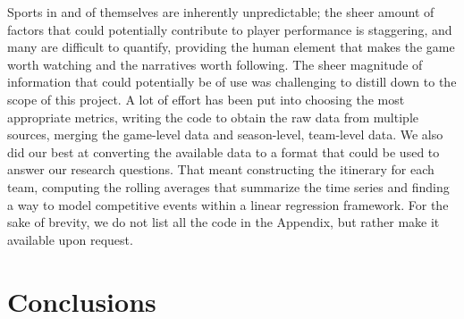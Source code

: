 \documentclass[
    12pt,
    a4paper,
    titlepage,  %
    abstract,  %
    headings=standardclasses,  %
    bibliography=totocnumbered  %
]{scrartcl}
\begin{document}
Sports in and of themselves are inherently unpredictable; the sheer amount of factors that could potentially contribute to player performance is staggering, and many are difficult to quantify, providing the human element that makes the game worth watching and the narratives worth following. The sheer magnitude of information that could potentially be of use was challenging to distill down to the scope of this project. A lot of effort has been put into choosing the most appropriate metrics, writing the code to obtain the raw data from multiple sources, merging the game-level data and season-level, team-level data. We also did our best at converting the available data to a format that could be used to answer our research questions. That meant constructing the itinerary for each team, computing the rolling averages that summarize the time series and finding a way to model competitive events within a linear regression framework. For the sake of brevity, we do not list all the code in the Appendix, but rather make it available upon request.

\section{Conclusions}
\end{document}
